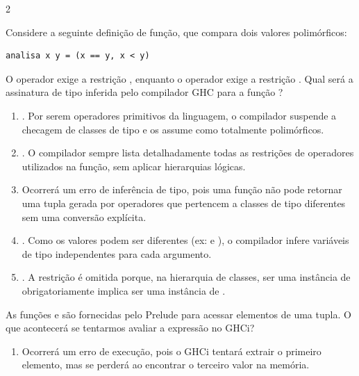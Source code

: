 \documentclass[a4paper,10pt,brazil]{article}
\begin{document}
\begin{multicols}{2}
\begin{enumerate}
\end{enumerate}

Considere a seguinte definição de função, que compara dois valores polimórficos:
\begin{verbatim}
analisa x y = (x == y, x < y)
\end{verbatim}
O operador \haskellinline{==} exige a restrição , enquanto o operador \haskellinline{<} exige a restrição . Qual será a assinatura de tipo inferida pelo compilador GHC para a função ?

\begin{enumerate}
  \item {}. Por serem operadores primitivos da linguagem, o compilador suspende a checagem de classes de tipo e os assume como totalmente polimórficos.

  \item {}. O compilador sempre lista detalhadamente todas as restrições de operadores utilizados na função, sem aplicar hierarquias lógicas.

  \item Ocorrerá um erro de inferência de tipo, pois uma função não pode retornar uma tupla gerada por operadores que pertencem a classes de tipo diferentes sem uma conversão explícita.

  \item {}. Como os valores podem ser diferentes (ex:  e ), o compilador infere variáveis de tipo independentes para cada argumento.

  \item {}. A restrição  é omitida porque, na hierarquia de classes, ser uma instância de  obrigatoriamente implica ser uma instância de .


\end{enumerate}

As funções  e  são fornecidas pelo Prelude para acessar elementos de uma tupla. O que acontecerá se tentarmos avaliar a expressão  no GHCi?

\begin{enumerate}
  \item Ocorrerá um erro de execução, pois o GHCi tentará extrair o primeiro elemento, mas se perderá ao encontrar o terceiro valor na memória.


\end{enumerate}
\end{multicols}
\end{document}
